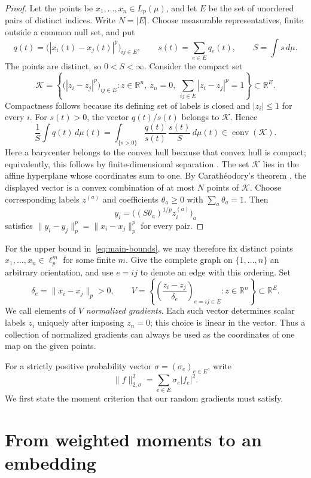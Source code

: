 \documentclass[11pt]{article}
\newcommand{\R}{\mathbb R}
\theoremstyle{remark}
\numberwithin{equation}{section}
\begin{document}
\begin{proof}
Let the points be $x_1,\ldots,x_n\in L_p(\mu)$, and let $E$ be the set
of unordered pairs of distinct indices. Write $N=|E|$. Choose measurable
representatives, finite outside a common null set, and put
\[
 q(t)=\bigl(|x_i(t)-x_j(t)|^p\bigr)_{ij\in E},\qquad
 s(t)=\sum_{e\in E}q_e(t),\qquad S=\int s\,d\mu.
\]
The points are distinct, so $0<S<\infty$. Consider the compact set
\[
 \mathcal K=\left\{
  \bigl(|z_i-z_j|^p\bigr)_{ij\in E}:
  z\in\R^n,\ z_n=0,\ \sum_{ij\in E}|z_i-z_j|^p=1
 \right\}\subset\R^E.
\]
Compactness follows because its defining set of labels is closed and
$|z_i|\le1$ for every $i$. For $s(t)>0$, the vector $q(t)/s(t)$ belongs
to $\mathcal K$. Hence
\[
 \frac1S\int q(t)\,d\mu(t)
 =\int_{\{s>0\}}\frac{q(t)}{s(t)}\,\frac{s(t)}S\,d\mu(t)
 \in\operatorname{conv}(\mathcal K).
\]
Here a barycenter belongs to the convex hull because that convex hull
is compact; equivalently, this follows by finite-dimensional separation
\cite[Theorems~11.3 and~17.2]{Rockafellar1970}.
The set $\mathcal K$ lies in the affine hyperplane whose coordinates
sum to one. By Carath\'eodory's theorem
\cite[Theorem~17.1]{Rockafellar1970}, the displayed vector is a
convex combination of at most $N$ points of $\mathcal K$. Choose
corresponding labels $z^{(a)}$ and coefficients $\theta_a\ge0$ with
$\sum_a\theta_a=1$. Then
\[
 y_i=\bigl((S\theta_a)^{1/p}z_i^{(a)}\bigr)_a
\]
satisfies $\|y_i-y_j\|_p^p=\|x_i-x_j\|_p^p$ for every pair.
\end{proof}

For the upper bound in~\eqref{eq:main-bounds}, we may therefore fix
distinct points $x_1,\ldots,x_n\in\ell_p^m$ for some finite $m$.
Give the complete graph on $\{1,\ldots,n\}$ an arbitrary orientation,
and use $e=ij$ to denote an edge with this ordering. Set
\[
 \delta_e=\|x_i-x_j\|_p>0,\qquad
 V=\left\{\left(\frac{z_i-z_j}{\delta_e}\right)_{e=ij\in E}:
 z\in\R^n\right\}\subset\R^E.
\]
We call elements of $V$ \emph{normalized gradients}. Each such vector
determines scalar labels $z_i$ uniquely after imposing $z_n=0$; this
choice is linear in the vector. Thus a collection of normalized
gradients can always be used as the coordinates of one map on the
given points.

For a strictly positive probability vector $\sigma=(\sigma_e)_{e\in E}$,
write
\[
 \|f\|_{2,\sigma}^2=\sum_{e\in E}\sigma_e|f_e|^2.
\]
We first state the moment criterion that our random gradients must satisfy.

\section{From weighted moments to an embedding}
\end{document}
